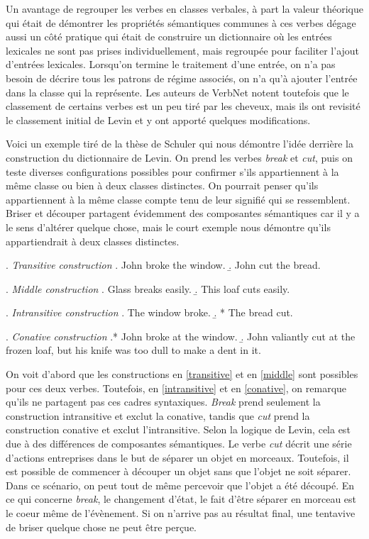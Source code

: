 Un avantage de regrouper les verbes en classes verbales, à part la valeur théorique qui était de démontrer les propriétés sémantiques communes à ces verbes  dégage aussi un côté pratique qui était de construire un dictionnaire où les entrées lexicales ne sont pas prises individuellement, mais regroupée pour faciliter l'ajout d'entrées lexicales. Lorsqu'on termine le traitement d'une entrée, on n'a pas besoin de décrire tous les patrons de régime associés, on n'a qu'à ajouter l'entrée dans la classe qui la représente. Les auteurs de VerbNet notent toutefois que le classement de certains verbes est un peu tiré par les cheveux, mais ils ont revisité le classement initial de Levin et y ont apporté quelques modifications\citep{SchulerVerbnetBroadcoverageComprehensive2005}. 

Voici un exemple tiré de la thèse de Schuler \citep{SchulerVerbnetBroadcoverageComprehensive2005} qui nous démontre l'idée derrière la construction du dictionnaire de Levin. On prend les verbes \emph{break} et \emph{cut}, puis on teste diverses configurations possibles pour confirmer s'ils appartiennent à la même classe ou bien à deux classes distinctes. On pourrait penser qu'ils appartiennent à la même classe compte tenu de leur signifié qui se ressemblent. Briser et découper partagent évidemment des composantes sémantiques car il y a le sens d'altérer quelque chose, mais le court exemple nous démontre qu'ils appartiendrait à deux classes distinctes.

\ex. \label{transitive} \emph{Transitive construction}
	\a. John broke the window.
	\b. John cut the bread.
	
\ex. \label{middle} \emph{Middle construction}
	\a. Glass breaks easily.
	\b. This loaf cuts easily.
	
\ex. \label{intransitive} \emph{Intransitive construction}
	\a. The window broke.
	\b. * The bread cut.

\ex. \label{conative} \emph{Conative construction}
	\a.* John broke at the window.
	\b. John valiantly cut at the frozen loaf, but his knife was too dull to make a dent in it.

On voit d'abord que les constructions en \ref{transitive} et en \ref{middle} sont possibles pour ces deux verbes. Toutefois, en \ref{intransitive} et en \ref{conative}, on remarque qu'ils ne partagent pas ces cadres syntaxiques. \emph{Break} prend seulement la construction intransitive et exclut la conative, tandis que \emph{cut} prend la construction conative et exclut l'intransitive. Selon la logique de Levin, cela est due à des différences de composantes sémantiques. Le verbe \emph{cut} décrit une série d'actions entreprises dans le but de séparer un objet en morceaux. Toutefois, il est possible de commencer à découper un objet sans que l'objet ne soit séparer. Dans ce scénario, on peut tout de même percevoir que l'objet a été découpé. En ce qui concerne \emph{break}, le changement d'état, le fait d'être séparer en morceau est le coeur même de l'évènement. Si on n'arrive pas au résultat final, une tentavive de briser quelque chose ne peut être perçue. 

